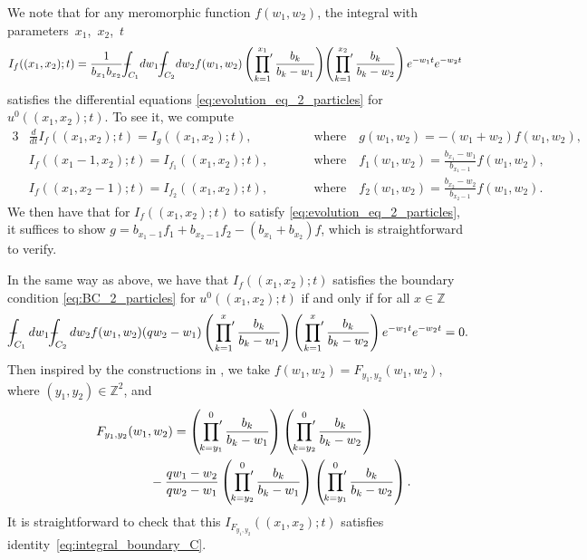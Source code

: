 \documentclass[11pt]{article}
\numberwithin{equation}{section}
\def\Xint#1{\mathchoice
{\XXint\displaystyle\textstyle{#1}}%
{\XXint\textstyle\scriptstyle{#1}}%
{\XXint\scriptstyle\scriptscriptstyle{#1}}%
{\XXint\scriptscriptstyle\scriptscriptstyle{#1}}%
\!\int}
\def\XXint#1#2#3{{\setbox0=\hbox{$#1{#2#3}{\int}$}
\vcenter{\hbox{$#2#3$}}\kern-.5\wd0}}
\def\dashint{\Xint-}
\newcommand{\intZ}{\mathbb{Z}}
\newcommand{\prodprime}{\sideset{}{'}\prod}
\begin{document}
We note that for any meromorphic function $f(w_1, w_2)$, the integral with parameters~$x_1$,~$x_2$,~$t$
\begin{gather*}
 I_f((x_1, x_2); t) = \frac{1}{b_{x_1} b_{x_2}} \dashint_{C_1} \! dw_1 \dashint_{C_2} \! dw_2 f(w_1, w_2) \left( \prodprime^{x_1}_{k = 1} \frac{b_k}{b_k - w_1} \right) \! \left( \prodprime^{x_2}_{k = 1} \frac{b_k}{b_k - w_2} \right) e^{-w_1 t} e^{-w_2 t}
\end{gather*}
satisf\/ies the dif\/ferential equations \eqref{eq:evolution_eq_2_particles} for $u^0((x_1, x_2); t)$. To see it, we compute
\begin{alignat*}{3}
 & \frac{d}{dt} I_f((x_1, x_2); t) =   I_g((x_1, x_2); t), \qquad && \text{where} \quad  g(w_1, w_2) =   -(w_1 + w_2) f(w_1, w_2),& \\
& I_f((x_1 - 1, x_2); t) =   I_{f_1}((x_1, x_2); t), \qquad && \text{where} \quad f_1(w_1, w_2) =   \frac{b_{x_1} - w_1}{b_{x_1 - 1}} f(w_1, w_2),& \\
& I_f((x_1, x_2 - 1); t) =   I_{f_2}((x_1, x_2); t), \qquad && \text{where} \quad  f_2(w_1, w_2) =   \frac{b_{x_2} - w_2}{b_{x_2 - 1}} f(w_1, w_2).&
\end{alignat*}
We then have that for $I_f((x_1, x_2); t)$ to satisfy \eqref{eq:evolution_eq_2_particles}, it suf\/f\/ices to show $g = b_{x_1 - 1} f_1 + b_{x_2 - 1} f_2 - (b_{x_1} + b_{x_2}) f$, which is straightforward to verify.

In the same way as above, we have that $I_f((x_1, x_2); t)$ satisf\/ies the boundary condition \eqref{eq:BC_2_particles} for $u^0((x_1, x_2); t)$ if and only if for all $x \in \intZ$
\begin{gather} \label{eq:integral_boundary_C}
 \dashint_{C_1} dw_1 \dashint_{C_2} dw_2 f(w_1, w_2) (qw_2 - w_1) \left( \prodprime^x_{k = 1} \frac{b_k}{b_k - w_1} \right) \left( \prodprime^x_{k = 1} \frac{b_k}{b_k - w_2} \right) e^{-w_1 t} e^{-w_2 t} = 0.\!\!\!
\end{gather}
Then inspired by the constructions in \cite{Korhonen-Lee14}, we take $f(w_1, w_2) = F_{y_1, y_2}(w_1, w_2)$, where $(y_1, y_2) \in \intZ^2$, and
\begin{gather*}
 F_{y_1, y_2}(w_1, w_2) = \left( \prodprime^0_{k = y_1} \frac{b_k}{b_k - w_1} \right) \left( \prodprime^0_{k = y_2} \frac{b_k}{b_k - w_2} \right) \\
 \hphantom{F_{y_1, y_2}(w_1, w_2) =}{}
 - \frac{qw_1 - w_2}{qw_2 - w_1} \left( \prodprime^0_{k = y_2} \frac{b_k}{b_k - w_1} \right) \left( \prodprime^0_{k = y_1} \frac{b_k}{b_k - w_2} \right).
\end{gather*}
It is straightforward to check that this $I_{F_{y_1, y_2}}((x_1, x_2); t)$ satisf\/ies identity~\eqref{eq:integral_boundary_C}.
\end{document}
